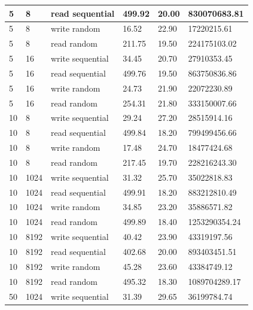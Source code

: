 \begin{tabularx}{\textwidth}{|X|X|X|X|X|X|}
    \hline
    \rowcolor{lightgray} 5 & 8 & read sequential & 499.92 & 20.00 & 830070683.81 \\
    \hline
    \rowcolor{lightgray} 5 & 8 & write random & 16.52 & 22.90 & 17220215.61 \\
    \hline
    \rowcolor{lightgray} 5 & 8 & read random & 211.75 & 19.50 & 224175103.02 \\
    \hline
    \hline
    5 & 16 & write sequential & 34.45 & 20.70 & 27910353.45 \\
    \hline
    5 & 16 & read sequential & 499.76 & 19.50 & 863750836.86 \\
    \hline
    5 & 16 & write random & 24.73 & 21.90 & 22072230.89 \\
    \hline
    5 & 16 & read random & 254.31 & 21.80 & 333150007.66 \\
    \hline
    \hline
    \rowcolor{lightgray} 10 & 8 & write sequential & 29.24 & 27.20 & 28515914.16 \\
    \hline
    \rowcolor{lightgray} 10 & 8 & read sequential & 499.84 & 18.20 & 799499456.66 \\
    \hline
    \rowcolor{lightgray} 10 & 8 & write random & 17.48 & 24.70 & 18477424.68 \\
    \hline
    \rowcolor{lightgray} 10 & 8 & read random & 217.45 & 19.70 & 228216243.30 \\
    \hline
    \hline
    10 & 1024 & write sequential & 31.32 & 25.70 & 35022818.83 \\
    \hline
    10 & 1024 & read sequential & 499.91 & 18.20 & 883212810.49 \\
    \hline
    10 & 1024 & write random & 34.85 & 23.20 & 35886571.82 \\
    \hline
    10 & 1024 & read random & 499.89 & 18.40 & 1253290354.24 \\
    \hline
    \hline
    \rowcolor{lightgray} 10 & 8192 & write sequential & 40.42 & 23.90 & 43319197.56 \\
    \hline
    \rowcolor{lightgray} 10 & 8192 & read sequential & 402.68 & 20.00 & 893403451.51 \\
    \hline
    \rowcolor{lightgray} 10 & 8192 & write random & 45.28 & 23.60 & 43384749.12 \\
    \hline
    \rowcolor{lightgray} 10 & 8192 & read random & 495.32 & 18.30 & 1089704289.17 \\
    \hline
    \hline
    50 & 1024 & write sequential & 31.39 & 29.65 & 36199784.74 \\
    \hline

\end{tabularx}

